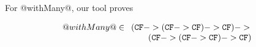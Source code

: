 For @withMany@, our tool proves

\[ @withMany@ \in \begin{array}[t]{l} ({\tt CF} -> ({\tt CF} -> {\tt CF}) -> {\tt CF}) -> \\
                                      \quad\quad ({\tt CF} -> ({\tt CF} -> {\tt CF}) -> {\tt CF})
                  \end{array}\] 

\begin{comment}
\subsection{A small case-study about invariants}

We consider a somewhat non-standard way of expressing propositional
logic formulae:

\begin{code}
data Formula = And [Formula]
             | Or  [Formula]
             | Neg (Formula)
             | Implies (Formula) (Formula)
             | Lit Bool
\end{code}

One invariant that we are particularily interested in is that we
should never have two consecutive negations, and that the lists of
@And@ and @Or@ are of length $\ge$ 2. We can express that as an ordinary
Haskell predicate:

\begin{code}
invariant :: Formula -> Bool
invariant f = case f of
  And xs      -> properList xs && all invariant xs
  Or xs       -> properList xs && all invariant xs
  Neg Neg{}   -> False
  Neg x       -> invariant x
  Implies x y -> invariant x && invariant y
  Lit x       -> True

properList :: [a] -> Bool
properList []  = False
properList [_] = False
properList _   = True
\end{code}

Now, we have a recursive function that negates formula:

\begin{code}
neg :: Formula -> Formula
neg (Neg f)         = f
neg (And fs)        = Or (map neg fs)
neg (Or fs)         = And (map neg fs)
neg (Implies f1 f2) = neg f2 `Implies` neg f1
neg (Lit b)         = Lit b
\end{code}

We make a combinator saying what it means to retain a predicate:

\begin{code}
retain :: (a -> Bool) -> Contract (a -> a)
retain p = Pred p :-> \x -> Pred (\r -> p x && p r)
\end{code}


\end{comment}
